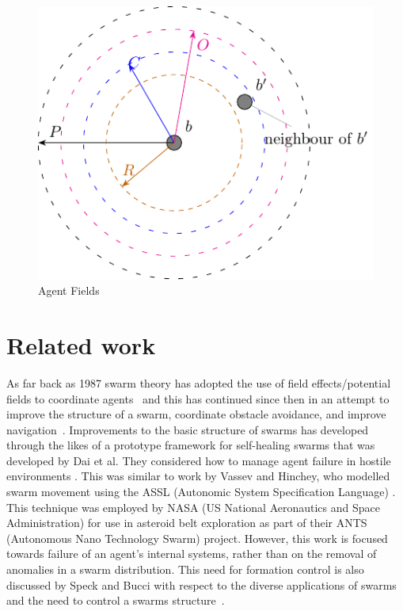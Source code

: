 \documentclass[12pt,a4paper]{IEEEtran}
\begin{document}
\begin{figure}[H]
	\centering
	\includegraphics[width=0.8\linewidth]{figures/stableswarm}
	\caption[Agent Fields]{Agent Fields}
	\label{fig:stableswarm}
\end{figure}


\section{Related work}

As far back as 1987 swarm theory has adopted the use of field effects/potential fields to coordinate agents~\cite{REY:87} and this has continued since then in an attempt to improve the structure of a swarm, coordinate obstacle avoidance, and improve navigation~\cite{BAFVM:06,BAF:06,BFV:07,BM:09,eliot2018metric,VG:05,HC:09,SW:03,Son2017}. Improvements to the basic structure of swarms has developed through the likes of a prototype framework for self-healing swarms that was developed by Dai et al. They considered how to manage agent failure in hostile environments \cite{DHMRZ:06}. This was similar to work by Vassev and Hinchey, who modelled swarm movement using the ASSL (Autonomic System Specification Language) \cite{VH:09}. This technique was employed by NASA (US National Aeronautics and Space Administration) for use in asteroid belt exploration as part of their ANTS (Autonomous Nano Technology Swarm) project. However, this work is focused towards failure of an agent's internal systems, rather than on the removal of anomalies in a swarm distribution. This need for formation control is also discussed by Speck and Bucci with respect to the diverse applications of swarms and the need to control a swarms structure~\cite{8430773}.
\end{document}
